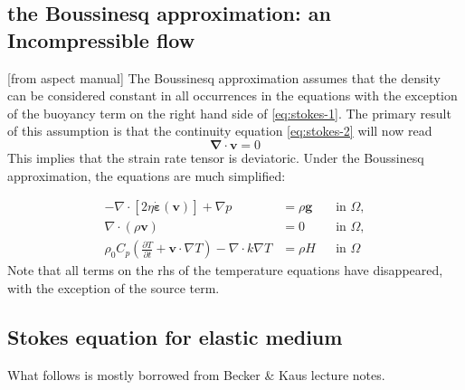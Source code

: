 \newpage
\subsection{the Boussinesq approximation: an Incompressible flow}


[from aspect manual]
The Boussinesq approximation assumes that the density can be
considered constant in all occurrences in the equations with the exception of
the buoyancy term on the right hand side of \eqref{eq:stokes-1}. The primary
result of this assumption is that the continuity equation \eqref{eq:stokes-2}
will now read
\[
{\bm \nabla}\cdot{\bm v} = 0
\]
This implies that the strain rate tensor is deviatoric.
Under the Boussinesq approximation, the equations are much simplified:

\begin{align}
  \label{eq:stokes-1}
  -\nabla \cdot \left[2\eta \dot{\bm \varepsilon}(\bm v)
                \right] + \nabla p &=
  \rho \bm g
  &
  & \textrm{in $\Omega$},
  \\
  \label{eq:stokes-2}
  \nabla \cdot (\rho \bm v) &= 0
  &
  & \textrm{in $\Omega$},
  \\
  \label{eq:temperature}
  \rho_0 C_p \left(\frac{\partial T}{\partial t} + \bm v\cdot\nabla T\right)
  - \nabla\cdot k\nabla T
  &=
  \rho H
  &
  & \textrm{in $\Omega$}
\end{align}
Note that all terms on the rhs of the temperature equations have disappeared, with the exception 
of the source term.


\newpage
\subsection{Stokes equation for elastic medium}

What follows is mostly borrowed from Becker \& Kaus lecture notes.


